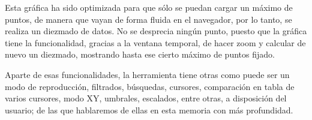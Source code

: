 Esta gráfica ha sido optimizada para que sólo se puedan cargar un máximo de puntos, de manera que vayan de forma fluida en el navegador, por lo tanto, se realiza un diezmado de datos. No se desprecia ningún punto, puesto que la gráfica tiene la funcionalidad, gracias a la ventana temporal, de hacer zoom y calcular de nuevo un diezmado, mostrando hasta ese cierto máximo de puntos fijado.

Aparte de esas funcionalidades, la herramienta tiene otras como puede ser un modo de reproducción, filtrados, búsquedas, cursores, comparación en tabla de varios cursores, modo XY, umbrales, escalados, entre otras, a disposición del usuario; de las que hablaremos de ellas en esta memoria con más profundidad.
